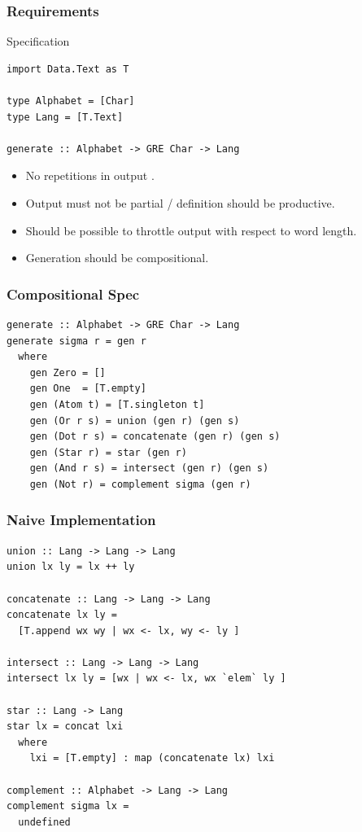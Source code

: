 \documentclass[pdftex]{beamer}
\begin{document}
\begin{frame}[fragile]
  \frametitle{Requirements}
  \begin{block}{Specification}
\begin{lstlisting}[numbers=none]
import Data.Text as T

type Alphabet = [Char]
type Lang = [T.Text]

generate :: Alphabet -> GRE Char -> Lang
\end{lstlisting}
  \end{block}
  \begin{itemize}
  \item No repetitions in output .
  \item Output must not be partial / definition should be productive.
  \item Should be possible to throttle output with respect to word length.
  \item Generation should be compositional.
  \end{itemize}
\end{frame}
\begin{frame}[fragile]
  \frametitle{Compositional Spec}
\begin{lstlisting}[numbers=none]
generate :: Alphabet -> GRE Char -> Lang
generate sigma r = gen r
  where
    gen Zero = []
    gen One  = [T.empty]
    gen (Atom t) = [T.singleton t]
    gen (Or r s) = union (gen r) (gen s)
    gen (Dot r s) = concatenate (gen r) (gen s)
    gen (Star r) = star (gen r)
    gen (And r s) = intersect (gen r) (gen s)
    gen (Not r) = complement sigma (gen r)
\end{lstlisting}
\end{frame}
\begin{frame}[fragile]
  \frametitle{Naive Implementation}
\vspace{-2\baselineskip}
\begin{lstlisting}[numbers=none]
union :: Lang -> Lang -> Lang
union lx ly = lx ++ ly

concatenate :: Lang -> Lang -> Lang
concatenate lx ly =
  [T.append wx wy | wx <- lx, wy <- ly ]

intersect :: Lang -> Lang -> Lang
intersect lx ly = [wx | wx <- lx, wx `elem` ly ]

star :: Lang -> Lang
star lx = concat lxi
  where
    lxi = [T.empty] : map (concatenate lx) lxi

complement :: Alphabet -> Lang -> Lang
complement sigma lx =
  undefined
\end{lstlisting}
\end{frame}
\end{document}
